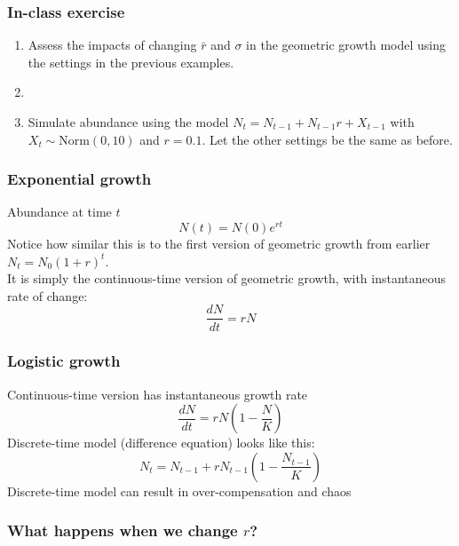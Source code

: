 \documentclass[color=usenames,dvipsnames]{beamer}\usepackage[]{graphicx}\usepackage[]{color}
\begin{document}
\begin{frame}
  \frametitle{In-class exercise}
  \centering
  \begin{enumerate}
    \item<1-> Assess the impacts of changing $\bar{r}$ and $\sigma$ in the
      geometric growth model using the settings in the previous examples.
    \item[]
    \item<2-> Simulate abundance using the model $N_t = N_{t-1} +
      N_{t-1}r + X_{t-1}$ with $X_t \sim \mathrm{Norm}(0, 10)$ and
      $r=0.1$. Let the other settings be the same as before.
  \end{enumerate}
\end{frame}




\begin{frame}
  \frametitle{Exponential growth}
  Abundance at time $t$
  \[
    N(t) = N(0)e^{rt}
  \]
  \pause
  Notice how similar this is to the first version of geometric growth
  from earlier $N_t = N_0(1+r)^t$. \\
  \pause
  \vfill
  It is simply the continuous-time version of geometric growth, with
  instantaneous rate of change:
  \[
    \frac{dN}{dt} = rN
  \]
\end{frame}








\begin{frame}
  \frametitle{Logistic growth}
  Continuous-time version has instantaneous growth rate
  \[
    \frac{dN}{dt} = rN\left(1-\frac{N}{K}\right)
  \]
  \pause
  \vfill
  Discrete-time model (difference equation) looks like this:
  \[
    N_t = N_{t-1} + rN_{t-1}\left(1-\frac{N_{t-1}}{K}\right)
  \]
  \pause
  \vfill
  Discrete-time model can result in over-compensation and chaos
\end{frame}




\begin{frame}[fragile]
  \frametitle{What happens when we change $r$?}





\begin{center}
\end{center}
\end{frame}
\end{document}
